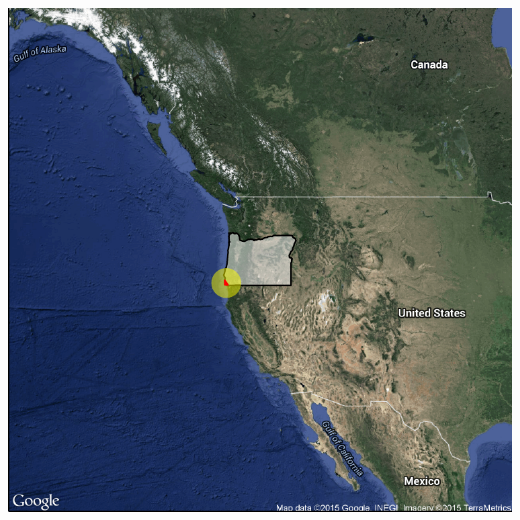 \documentclass{beamer}\usepackage[]{graphicx}\usepackage[]{color}
\begin{document}
\begin{frame}[allowpagebreak,T]


	\centering
	\includegraphics[keepaspectratio, height=\paperheight]{figure/insetplot-1.pdf}
	\vfill
\end{frame}
\end{document}
